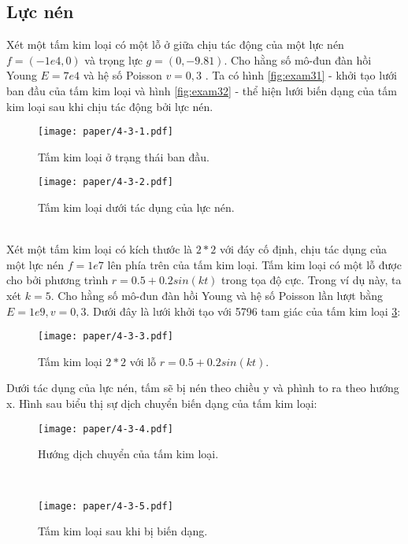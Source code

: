\subsection{Lực nén}
Xét một tấm kim loại có một lỗ ở giữa chịu tác động của một lực nén $f=(-1e4,0)$ và trọng lực $g=(0,-9.81)$. Cho hằng số mô-đun đàn hồi Young $E=7e4$ và hệ số Poisson $v=0,3$ \cite{TIT-07}. Ta có hình \eqref{fig:exam31} - khởi tạo lưới ban đầu của tấm kim loại và hình \eqref{fig:exam32} - thể hiện lưới biến dạng của tấm kim loại sau khi chịu tác động bởi lực nén.\\
\begin{figure}[http]
\centering
\texttt{[image: paper/4-3-1.pdf]}
\caption{Tấm kim loại ở trạng thái ban đầu.}
\label{fig:exam31}
\end{figure}
\begin{figure}[http]
\centering
\texttt{[image: paper/4-3-2.pdf]}
\caption{Tấm kim loại dưới tác dụng của lực nén.}
\label{fig:exam32}
\end{figure}\\

Xét một tấm kim loại có kích thước là $2 * 2$ với đáy cố định, chịu tác dụng của một lực nén $f = 1e7$ lên phía trên của tấm kim loại. Tấm kim loại có một lỗ được cho bởi phương trình $r = 0.5 + 0.2 sin(kt)$ trong tọa độ cực. Trong ví dụ này, ta xét $k=5$. Cho hằng số mô-đun đàn hồi Young và hệ số Poisson lần lượt bằng $E=1e9, v=0,3$. Dưới đây là lưới khởi tạo với 5796 tam giác của tấm kim loại \ref{fig:exam33}:\\

\begin{figure}[http]
\centering
\texttt{[image: paper/4-3-3.pdf]}
\caption{Tấm kim loại $2 * 2$ với lỗ $r = 0.5 + 0.2 sin(kt)$.}
\label{fig:exam33}
\end{figure}
Dưới tác dụng của lực nén, tấm sẽ bị nén theo chiều y và phình to ra theo hướng x. Hình sau biểu thị sự dịch chuyển biến dạng của tấm kim loại:\\
\begin{figure}[http]
\centering
\texttt{[image: paper/4-3-4.pdf]}
\caption{Hướng dịch chuyển của tấm kim loại.}
\label{fig:exam34}
\end{figure}\\
\begin{figure}[http]
\centering
\texttt{[image: paper/4-3-5.pdf]}
\caption{Tấm kim loại sau khi bị biến dạng.}
\label{fig:exam35}
\end{figure}\\
